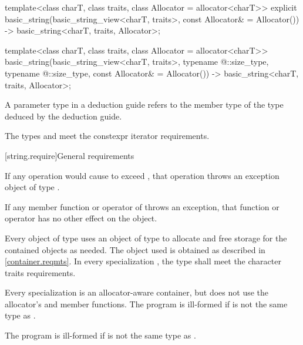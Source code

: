 \begin{codeblock}
{  template<class charT,
           class traits,
           class Allocator = allocator<charT>>
    explicit basic_string(basic_string_view<charT, traits>, const Allocator& = Allocator())
      -> basic_string<charT, traits, Allocator>;

  template<class charT,
           class traits,
           class Allocator = allocator<charT>>
    basic_string(basic_string_view<charT, traits>,
                 typename @\seebelow@::size_type, typename @\seebelow@::size_type,
                 const Allocator& = Allocator())
      -> basic_string<charT, traits, Allocator>;
}
\end{codeblock}

\pnum
A  parameter type in
a  deduction guide
refers to the  member type of
the type deduced by the deduction guide.

\pnum
The types  and  meet
the constexpr iterator requirements.

[string.require]{General requirements}

\pnum
If any operation would cause  to
exceed , that operation throws an
exception object of type .

\pnum
If any member function or operator of  throws an exception, that
function or operator has no other effect on the  object.

\pnum
Every object of type
 uses an object of type
 to allocate and free storage for the contained 
objects as needed. The  object used is
obtained as described in \ref{container.reqmts}.
In every specialization ,
the type  shall meet
the character traits requirements.
\begin{note}
Every specialization  is
an allocator-aware container,
but does not use the allocator's  and 
member functions.
The program is ill-formed if
 is not the same type as .
\end{note}
\begin{note}
The program is ill-formed if 
is not the same type as .
\end{note}

